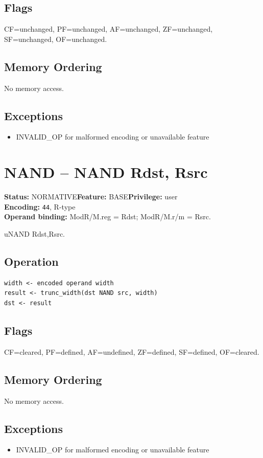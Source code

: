 \documentclass[10pt]{article}
\begin{document}
\subsection*{Flags}
CF=unchanged, PF=unchanged, AF=unchanged, ZF=unchanged, SF=unchanged, OF=unchanged.
\subsection*{Memory Ordering}
No memory access.
\subsection*{Exceptions}
\begin{itemize}
\item INVALID\_OP for malformed encoding or unavailable feature
\end{itemize}
\clearpage

\section{NAND -- NAND Rdst, Rsrc}
\textbf{Status:} NORMATIVE\quad \textbf{Feature:} BASE\quad \textbf{Privilege:} user\\
\textbf{Encoding:} \texttt{44}, R-type\\
\textbf{Operand binding:} ModR/M.reg = Rdst; ModR/M.r/m = Rsrc.

uNAND Rdst,Rsrc.

\subsection*{Operation}
\begin{lstlisting}
width <- encoded operand width
result <- trunc_width(dst NAND src, width)
dst <- result
\end{lstlisting}
\subsection*{Flags}
CF=cleared, PF=defined, AF=undefined, ZF=defined, SF=defined, OF=cleared.
\subsection*{Memory Ordering}
No memory access.
\subsection*{Exceptions}
\begin{itemize}
\item INVALID\_OP for malformed encoding or unavailable feature
\end{itemize}
\clearpage
\end{document}
